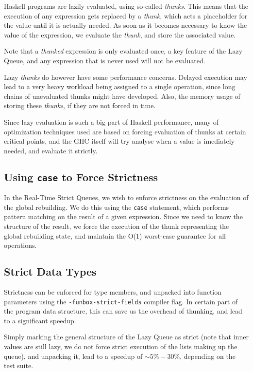 Haskell programs are lazily evaluated, using so-called \textit{thunks}. This means that the execution of any expression gets replaced by a \textit{thunk}, which acts a placeholder for the value until it is actually needed. As soon as it becomes necessary to know the value of the expression, we evaluate the \textit{thunk}, and store the associated value.

Note that a \textit{thunked} expression is only evaluated once, a key feature of the Lazy Queue, and any expression that is never used will not be evaluated. 

Lazy \textit{thunks} do however have some performance concerns. Delayed execution may lead to a very heavy workload being assigned to a single operation, since long chains of unevaluated thunks might have developed. Also, the memory usage of storing these \textit{thunks}, if they are not forced in time.

Since lazy evaluation is such a big part of Haskell performance, many of optimization techniques used are based on forcing evaluation of thunks at certain critical points, and the GHC itself will try analyse when a value is imediately needed, and evaluate it strictly.

\subsection{Using \texttt{case} to Force Strictness}

In the Real-Time Strict Queues, we wish to enforce strictness on the evaluation of the global rebuilding. We do this using the \texttt{case} statement, which performs pattern matching on the result of a given expression. Since we need to know the structure of the result, we force the execution of the thunk representing the global rebuilding state, and maintain the O(1) worst-case guarantee for all operations.

\subsection{Strict Data Types} Strictness can be enforced for type members, and unpacked into function parameters using the \texttt{-funbox-strict-fields} compiler flag. In certain part of the program data structure, this can save us the overhead of thunking, and lead to a significant speedup.

Simply marking the general structure of the Lazy Queue as strict (note that inner values are still lazy, we do not force strict execution of the lists making up the queue), and unpacking it, lead to a speedup of $\sim 5\%-30\%$, depending on the test suite.

